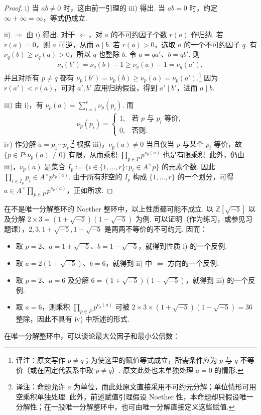 \begin{proof}
i) 当 $ab\ne0$ 时，这由前一引理的 iii) 得出. 当 $ab=0$ 时，约定 $\infty+\infty=\infty$，等式仍成立.

ii) $\Rightarrow$ 由 i) 得出. 对于 $\Leftarrow$，对 $a$ 的不可约因子个数 $r(a)$ 作归纳. 若 $r(a)=0$，则 $a$ 可逆，从而 $a\mid b$. 若 $r(a)>0$，选取 $a$ 的一个不可约因子 $q$. 有 $\nu_q(b)\geqslant\nu_q(a)>0$，所以 $q$ 也整除 $b$. 令 $a=qa'$、$b=qb'$. 则
\begin{align*}
\nu_q(b')=\nu_q(b)-1\geqslant\nu_q(a)-1=\nu_q(a'),
\end{align*}
并且对所有 $p\ne q$ 都有 $\nu_p(b')=\nu_p(b)\geqslant\nu_p(a)=\nu_p(a')$.\footnote{译注：原文写作 $p\ne q$；为使这里的赋值等式成立，所需条件应为 $p$ 与 $q$ 不等价（或在固定代表系中取 $p\ne q$）. 原文此处也未单独处理 $a=0$ 的情形.} 因为 $r(a')<r(a)$，可对 $a',b'$ 应用归纳假设，得到 $a'\mid b'$，进而 $a\mid b$.

iii) 由 i)，有 $\nu_p(a)=\sum_{i=1}^r\nu_p(p_i)$. 而
\begin{align*}
\nu_p(p_i)=\begin{cases}1,&\text{若 }p\text{ 与 }p_i\text{ 等价},\\0,&\text{否则}.\end{cases}
\end{align*}
iv) 作分解 $a=p_1\cdots p_r$.\footnote{译注：命题允许 $a$ 为单位，而此处原文直接采用不可约元分解；单位情形可用空乘积单独处理. 此外，前述赋值引理假设 Noether 性，本命题却只假设唯一分解性；在一般唯一分解整环中，也可由唯一分解直接定义这些赋值.} 根据 iii)，$\nu_p(a)\ne0$ 当且仅当 $p$ 与某个 $p_i$ 等价，故 $\{p\in P:\nu_p(a)\ne0\}$ 有限，从而乘积 $\prod_{p\in P}p^{\nu_p(a)}$ 也是有限乘积. 此外，仍由 iii)，$\nu_p(a)$ 是集合 $I_p:=\{i\in\{1,\ldots,r\}:p_i\in A^\times p\}$ 的元素个数. 因此 $\prod_{i\in I_p}p_i\in A^\times p^{\nu_p(a)}$. 由于所有非空的 $I_p$ 构成 $\{1,\ldots,r\}$ 的一个划分，可得 $a\in A^\times\prod_{p\in P}p^{\nu_p(a)}$，正如所求.
\end{proof}

\begin{remark*}
在不是唯一分解整环的 Noether 整环中，以上性质都可能不成立. 以 $\mathbb Z[\sqrt{-5}]$ 以及分解 $2\times3=(1+\sqrt{-5})(1-\sqrt{-5})$ 为例. 可以证明（作为练习，或参见习题课），$2,3,1+\sqrt{-5},1-\sqrt{-5}$ 是两两不等价的不可约元. 因而：
\begin{itemize}
\item 取 $p=2$、$a=1+\sqrt{-5}$、$b=1-\sqrt{-5}$，就得到性质 i) 的一个反例.
\item 取 $a=2(1+\sqrt{-5})$、$b=6$，就得到 ii) 中 $\Leftarrow$ 方向的一个反例.
\item 取 $p=2$、$a=6$ 及分解 $6=(1+\sqrt{-5})(1-\sqrt{-5})$，就得到 iii) 的一个反例.
\item 取 $a=6$，则乘积 $\prod_{p\in P}p^{\nu_p(a)}$ 可被 $2\times3\times(1+\sqrt{-5})(1-\sqrt{-5})=36$ 整除，因此不具有 iv) 中所述的形式.
\end{itemize}
\end{remark*}
在唯一分解整环中，可以谈论最大公因子和最小公倍数：

